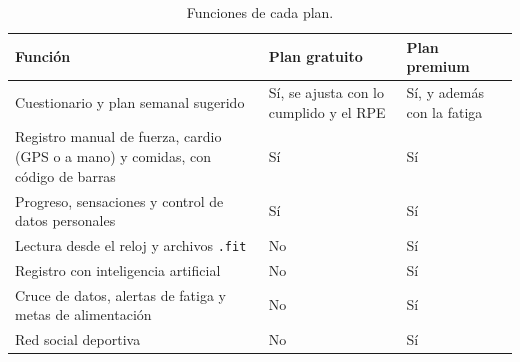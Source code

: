 \begin{table}[h!]
    \centering
    \renewcommand{\arraystretch}{1.3}
    \begin{tabular}{|>{\raggedright\arraybackslash}p{7.5cm}|>{\raggedright\arraybackslash}p{3.5cm}|>{\raggedright\arraybackslash}p{3.5cm}|}
        \hline
        \rowcolor[HTML]{EFEFEF}
        \textbf{Función} & \textbf{Plan gratuito} & \textbf{Plan premium} \\ \hline
        Cuestionario y plan semanal sugerido & Sí, se ajusta con lo cumplido y el RPE & Sí, y además con la fatiga \\ \hline
        Registro manual de fuerza, cardio (GPS o a mano) y comidas, con código de barras & Sí & Sí \\ \hline
        Progreso, sensaciones y control de datos personales & Sí & Sí \\ \hline
        Lectura desde el reloj y archivos \texttt{.fit} & No & Sí \\ \hline
        Registro con inteligencia artificial & No & Sí \\ \hline
        Cruce de datos, alertas de fatiga y metas de alimentación & No & Sí \\ \hline
        Red social deportiva & No & Sí \\ \hline
    \end{tabular}
    \caption{Funciones de cada plan.}
    \label{tab:funciones_plan}
\end{table}
\newpage
